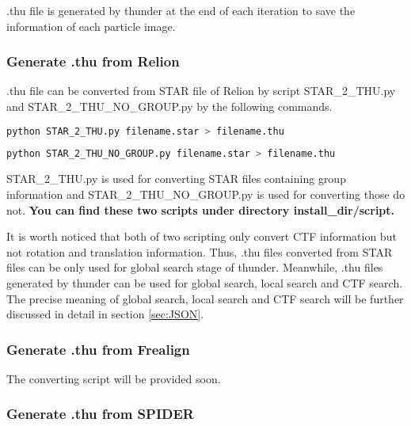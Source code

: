 \documentclass{article}
\begin{document}
            
            \textsf{.thu} file is generated by \textsf{thunder} at the end of each iteration to save the information of each particle image.
            
            \subsubsection{Generate \textsf{.thu} from Relion}
            
            \textsf{.thu} file can be converted from STAR file of Relion by script \textsf{STAR\_2\_THU.py} and \textsf{STAR\_2\_THU\_NO\_GROUP.py} by the following commands.
               
            \begin{lstlisting}[language={sh}]
python STAR_2_THU.py filename.star > filename.thu
            \end{lstlisting}
            
            \begin{lstlisting}[language={sh}]
python STAR_2_THU_NO_GROUP.py filename.star > filename.thu
            \end{lstlisting}
            
            \textsf{STAR\_2\_THU.py} is used for converting STAR files containing group information and \textsf{STAR\_2\_THU\_NO\_GROUP.py} is used for converting those do not. \textbf{You can find these two scripts under directory \textsf{install\_dir/script}.}
            
            It is worth noticed that both of two scripting only convert CTF information but not rotation and translation information. Thus, \textsf{.thu} files converted from STAR files can be only used for global search stage of \textsf{thunder}. Meanwhile, \textsf{.thu} files generated by \textsf{thunder} can be used for global search, local search and CTF search. The precise meaning of global search, local search and CTF search will be further discussed in detail in section \ref{sec:JSON}.
            
            \subsubsection{Generate \textsf{.thu} from Frealign}
            
            The converting script will be provided soon.
            
            \subsubsection{Generate \textsf{.thu} from SPIDER}
            
\end{document}
